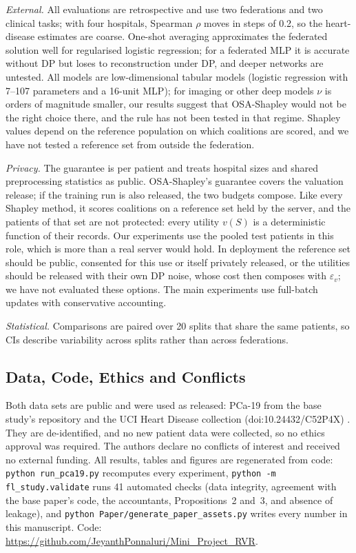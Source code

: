 \documentclass[journal]{IEEEtran}
\begin{document}
\emph{External.} All evaluations are retrospective and use two federations and two clinical tasks; with four hospitals, Spearman $\rho$ moves in steps of 0.2, so the heart-disease estimates are coarse. One-shot averaging approximates the federated solution well for regularised logistic regression; for a federated MLP it is accurate without DP but loses to reconstruction under DP, and deeper networks are untested. All models are low-dimensional tabular models (logistic regression with 7--107 parameters and a 16-unit MLP); for imaging or other deep models $\nu$ is orders of magnitude smaller, our results suggest that OSA-Shapley would not be the right choice there, and the rule has not been tested in that regime. Shapley values depend on the reference population on which coalitions are scored, and we have not tested a reference set from outside the federation.

\emph{Privacy.} The guarantee is per patient and treats hospital sizes and shared preprocessing statistics as public. OSA-Shapley's guarantee covers the valuation release; if the training run is also released, the two budgets compose. Like every Shapley method, it scores coalitions on a reference set held by the server, and the patients of that set are not protected: every utility $v(S)$ is a deterministic function of their records. Our experiments use the pooled test patients in this role, which is more than a real server would hold. In deployment the reference set should be public, consented for this use or itself privately released, or the utilities should be released with their own DP noise, whose cost then composes with $\varepsilon_v$; we have not evaluated these options. The main experiments use full-batch updates with conservative accounting.

\emph{Statistical.} Comparisons are paired over 20 splits that share the same patients, so CIs describe variability across splits rather than across federations.

\subsection{Data, Code, Ethics and Conflicts}
Both data sets are public and were used as released: PCa-19 from the base study's repository \cite{Kazlouski2025HospitalParticipation} and the UCI Heart Disease collection (doi:10.24432/C52P4X) \cite{Janosi1988HeartDisease}. They are de-identified, and no new patient data were collected, so no ethics approval was required. The authors declare no conflicts of interest and received no external funding. All results, tables and figures are regenerated from code: \texttt{python run\_pca19.py} recomputes every experiment, \texttt{python -m fl\_study.validate} runs 41 automated checks (data integrity, agreement with the base paper's code, the accountants, Propositions~2 and~3, and absence of leakage), and \texttt{python Paper/generate\_paper\_assets.py} writes every number in this manuscript. Code: \url{https://github.com/JeyanthPonnaluri/Mini_Project_RVR}.
\end{document}
